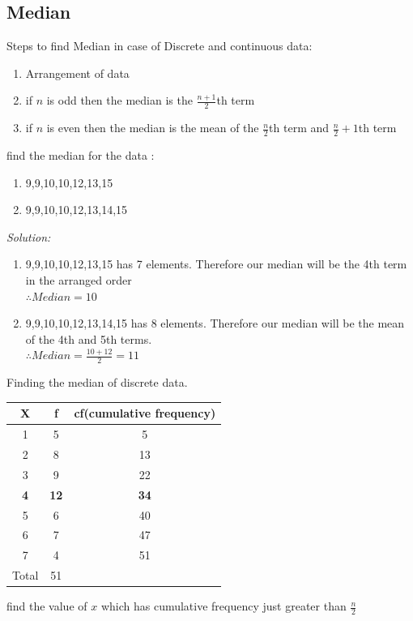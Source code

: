 \documentclass[11pt,letterpaper]{article}
\newenvironment{problem}[2][Problem]                                  
        {\begin{tcolorbox}[colback=white,colframe=gray!50,title=#1 #2]}
        {\end{tcolorbox}}
\newenvironment{solution}                      
        {\begin{mdframed}\textit{Solution:} \\}
        {\end{mdframed}}
\begin{document}
\subsection{Median}
Steps to find Median in case of Discrete and continuous data:

\begin{enumerate}
  \item Arrangement of data
  \item if $n$ is odd then the median is the $ \frac{n+1}{2}$th term
  \item if $n$ is even then the median is the mean of the $\frac{n}{2}$th term and $\frac{n}{2}+1$th term
\end{enumerate}
\begin{problem}3
   find the median for the data : 
   \begin{enumerate}
      \item 9,9,10,10,12,13,15
      \item 9,9,10,10,12,13,14,15
   \end{enumerate}
\end{problem}

\begin{solution}
  \begin{enumerate}
    \item 9,9,10,10,12,13,15 has 7 elements. Therefore our median will be the 4th term in the arranged order\\
      $ \therefore Median = 10 $
    \item 9,9,10,10,12,13,14,15 has 8 elements. Therefore our median will be the mean of the 4th and 5th terms. \\
      $\therefore Median = \frac{10+12}{2}= 11$
  \end{enumerate}
\end{solution}

\begin{problem} 4
  Finding the median of discrete data. 
  \begin{center}
    \begin{tabular}{c|c|c}
      X & f & cf(cumulative frequency)\\
      \hline
      1 & 5 & 5\\ 
      2 & 8 & 13\\ 
      3 & 9 & 22\\ 
      \textbf{4} & \textbf{12} & \textbf{34}\\ 
      5 & 6 & 40\\ 
      6 & 7 & 47\\ 
      7 & 4 & 51\\ 
      \hline
      Total & 51 \\
    \end{tabular}
  \end{center}

  find the value of $x$ which has cumulative frequency just greater than $\frac{n}{2}$
\end{problem}
\end{document}
